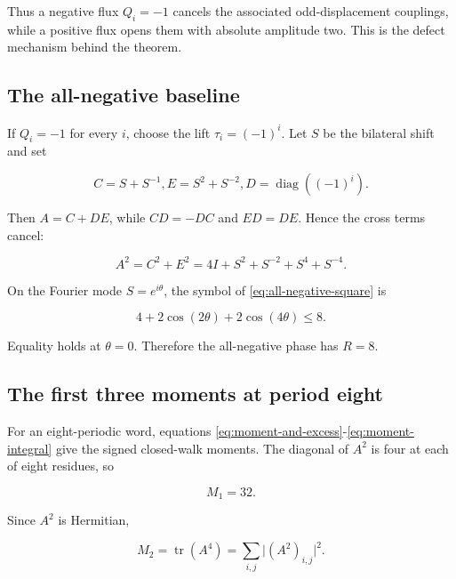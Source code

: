 Thus a negative flux \(Q_i=-1\) cancels the associated odd-displacement
couplings, while a positive flux opens them with absolute amplitude two. This
is the defect mechanism behind the theorem.

\subsection{The all-negative baseline}\label{subsec:all-negative-baseline}

If \(Q_i=-1\) for every \(i\), choose the lift \(\tau_i=(-1)^i\). Let \(S\) be the
bilateral shift and set

\begin{equation}
C=S+S^{-1},       E=S^{2}+S^{-2},       D=\operatorname{diag}((-1)^i).
\end{equation}

Then \(A=C+DE\), while \(CD=-DC\) and \(ED=DE\). Hence the cross terms cancel:

\begin{equation}
\label{eq:all-negative-square}
A^{2}=C^{2}+E^{2}=4I+S^{2}+S^{-2}+S^{4}+S^{-4}.
\end{equation}

On the Fourier mode \(S=e^{i \theta}\), the symbol of \eqref{eq:all-negative-square} is

\begin{equation}
\label{eq:all-negative-dispersion}
4+2\cos(2\theta)+2\cos(4\theta)\leq 8.
\end{equation}

Equality holds at \(\theta=0\). Therefore the all-negative phase has \(R=8\).

\subsection{The first three moments at period eight}

For an eight-periodic word, equations \eqref{eq:moment-and-excess}-\eqref{eq:moment-integral} give the signed closed-walk
moments. The diagonal of \(A^{2}\) is four at each of eight residues, so

\begin{equation}
\label{eq:period-eight-first-moment}
M_{1}=32.
\end{equation}

Since \(A^{2}\) is Hermitian,

\begin{equation}
M_{2}=\operatorname{tr}(A^{4})=\sum_{i,j}\lvert (A^{2})_{i,j}\rvert^{2}.
\end{equation}

